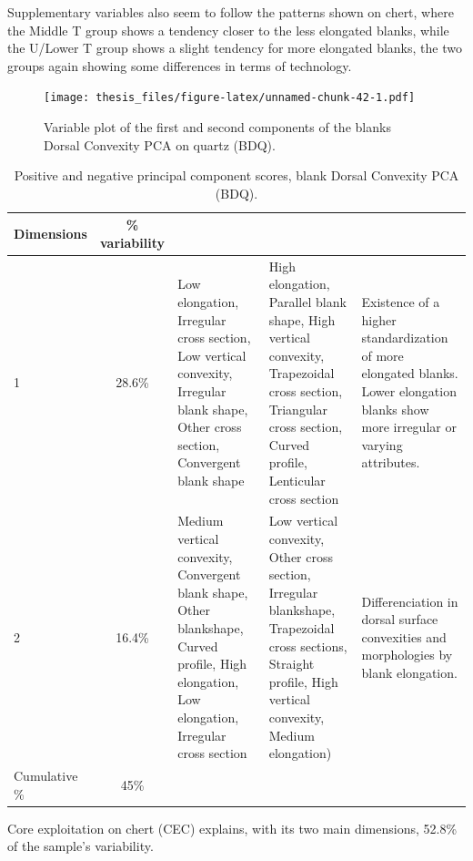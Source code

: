 \documentclass[12pt,twoside]{reedthesis}
\begin{document}
Supplementary variables also seem to follow the patterns shown on chert, where the Middle T group shows a tendency closer to the less elongated blanks, while the U/Lower T group shows a slight tendency for more elongated blanks, the two groups again showing some differences in terms of technology.
\begin{figure}
\centering
\texttt{[image: thesis\_files/figure-latex/unnamed-chunk-42-1.pdf]}
\caption{\label{fig:unnamed-chunk-42}Variable plot of the first and second components of the blanks Dorsal Convexity PCA on quartz (BDQ).}
\end{figure}
\begin{table}

\caption{\label{tab:unnamed-chunk-43}Positive and negative principal component scores, blank Dorsal Convexity PCA (BDQ).}
\centering
\begin{tabular}[t]{lc>{\raggedright\arraybackslash}p{3cm}>{\raggedright\arraybackslash}p{3cm}>{\raggedright\arraybackslash}p{3cm}}
\toprule
\multicolumn{1}{c}{\textbf{Dimensions}} & \multicolumn{1}{c}{\textbf{\% variability}} & \multicolumn{1}{>{\centering\arraybackslash}p{3cm}}{\textbf{+}} & \multicolumn{1}{>{\centering\arraybackslash}p{3cm}}{\textbf{-}} & \multicolumn{1}{>{\centering\arraybackslash}p{3cm}}{\textbf{Interpretation}}\\
\midrule
1 & 28.6\% & Low elongation, Irregular cross section, Low vertical convexity, Irregular blank shape, Other cross section, Convergent blank shape & High elongation, Parallel blank shape, High vertical convexity, Trapezoidal cross section, Triangular cross section, Curved profile, Lenticular cross section & Existence of a higher standardization of more elongated blanks. Lower elongation blanks show more irregular or varying attributes.\\
2 & 16.4\% & Medium vertical convexity, Convergent blank shape, Other blankshape, Curved profile, High elongation, Low elongation, Irregular cross section & Low vertical convexity, Other cross section, Irregular blankshape, Trapezoidal cross sections, Straight profile, High vertical convexity, Medium elongation) & Differenciation in dorsal surface convexities and morphologies by blank elongation.\\
Cumulative \% & 45\% &  &  & \\
\bottomrule
\end{tabular}
\end{table}
Core exploitation on chert (CEC) explains, with its two main dimensions, 52.8\% of the sample's variability.
\end{document}
